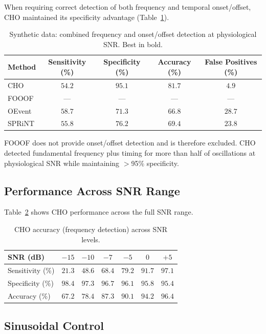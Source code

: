 \documentclass[11pt]{article}
\begin{document}
When requiring correct detection of both frequency and temporal onset/offset, CHO maintained its specificity advantage (Table~\ref{tab:synth_timing}).

\begin{table}[H]
\centering
\caption{Synthetic data: combined frequency and onset/offset detection at physiological SNR. Best in bold.}
\label{tab:synth_timing}
\begin{tabular}{@{}lcccc@{}}
\toprule
Method & Sensitivity (\%) & Specificity (\%) & Accuracy (\%) & False Positives (\%) \\
\midrule
CHO & $54.2$ & $\mathbf{95.1}$ & $\mathbf{81.7}$ & $\mathbf{4.9}$ \\
FOOOF & --- & --- & --- & --- \\
OEvent & $58.7$ & $71.3$ & $66.8$ & $28.7$ \\
SPRiNT & $55.8$ & $76.2$ & $69.4$ & $23.8$ \\
\bottomrule
\end{tabular}
\end{table}

FOOOF does not provide onset/offset detection and is therefore excluded. CHO detected fundamental frequency plus timing for more than half of oscillations at physiological SNR while maintaining $>$95\% specificity.

\subsection{Performance Across SNR Range}

Table~\ref{tab:snr_range} shows CHO performance across the full SNR range.

\begin{table}[H]
\centering
\caption{CHO accuracy (frequency detection) across SNR levels.}
\label{tab:snr_range}
\begin{tabular}{@{}lcccccc@{}}
\toprule
SNR (dB) & $-15$ & $-10$ & $-7$ & $-5$ & $0$ & $+5$ \\
\midrule
Sensitivity (\%) & $21.3$ & $48.6$ & $68.4$ & $79.2$ & $91.7$ & $97.1$ \\
Specificity (\%) & $98.4$ & $97.3$ & $96.7$ & $96.1$ & $95.8$ & $95.4$ \\
Accuracy (\%) & $67.2$ & $78.4$ & $87.3$ & $90.1$ & $94.2$ & $96.4$ \\
\bottomrule
\end{tabular}
\end{table}

\subsection{Sinusoidal Control}
\end{document}

